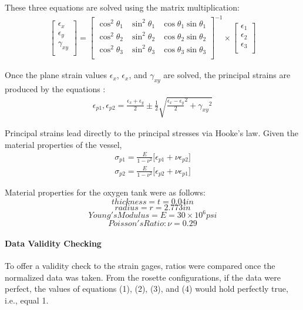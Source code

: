 \documentclass[12pt]{article}
\begin{document}
These three equations are solved using the matrix multiplication: 
\begin{align}
\begin{bmatrix}
\epsilon_x \\
\epsilon_y \\
\gamma_{xy} \\
\end{bmatrix}
= 
\begin{bmatrix}
   \cos^{2}\theta_1 & \sin^{2}\theta_1 & \cos{\theta_1}\sin{\theta_1}  \\
   \cos^{2}\theta_2 & \sin^{2}\theta_2 & \cos{\theta_2}\sin{\theta_2}  \\
   \cos^{2}\theta_3 & \sin^{2}\theta_3 & \cos{\theta_3}\sin{\theta_3}  \\
\end{bmatrix}^{-1} \times
\begin{bmatrix}
\epsilon_1 \\
\epsilon_2 \\
\epsilon_3 \\
\end{bmatrix}
\end{align}

Once the plane strain values $\epsilon_x$, $\epsilon_x$, and $\gamma_{xy}$ are solved, the principal strains
are produced by the equations :
\begin{align}
\epsilon_{p1}, \epsilon_{p2} = \frac{\epsilon_x + \epsilon_y}{2} \pm
\frac{1}{2} \sqrt{ { \frac{\epsilon_x - \epsilon_y}{2}}^2 + {\gamma_{xy}}^2 }
\end{align}


Principal strains lead directly to the principal stresses via Hooke's law. Given the material properties of the vessel,
\begin{align}
\sigma_{p1} = \frac{E}{1-\nu^2} \big[ \epsilon_{p1} + \nu\epsilon_{p2} \big] \\
\sigma_{p2} = \frac{E}{1-\nu^2} \big[ \epsilon_{p2} + \nu\epsilon_{p1} \big]
\end{align}

Material properties for the oxygen tank were as follows: 
$$ thickness = t = 0.04 in $$
$$ radius = r =2.773 in $$
$$ Young's Modulus = E = 30 \times 10^6 psi $$ 
$$ Poisson's Ratio: \nu = 0.29 $$ 
	
\paragraph {Data Validity Checking} 
To offer a validity check to the strain gages, ratios were compared once the normalized data
was taken. From the rosette configurations, if the data were perfect, the values 
of equations (1), (2), (3), and (4) would hold perfectly true, i.e., equal 1. \\
\end{document}

